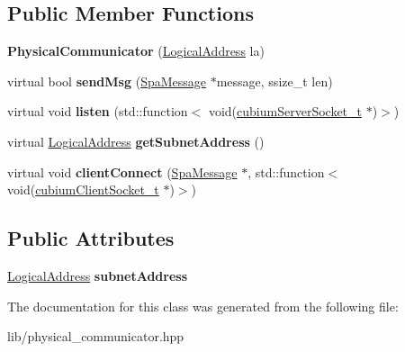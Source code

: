 \subsection*{Public Member Functions}
\begin{DoxyCompactItemize}
\item 
\mbox{\label{classPhysicalCommunicator_a6895d0ce73240eb80d0b9a060da7c728}} 
{\bfseries Physical\+Communicator} (\hyperlink{structLogicalAddress}{Logical\+Address} la)
\item 
\mbox{\label{classPhysicalCommunicator_a9fc5595b693f9908a20d0e64a6579bb5}} 
virtual bool {\bfseries send\+Msg} (\hyperlink{structSpaMessage}{Spa\+Message} $\ast$message, ssize\+\_\+t len)
\item 
\mbox{\label{classPhysicalCommunicator_a4886f4453c1f830ceaef56bc8602423f}} 
virtual void {\bfseries listen} (std\+::function$<$ void(\hyperlink{structcubiumServerSocket__t}{cubium\+Server\+Socket\+\_\+t} $\ast$)$>$)
\item 
\mbox{\label{classPhysicalCommunicator_a80f3bdf1beb61e5f6721e30fdc4d5d7f}} 
virtual \hyperlink{structLogicalAddress}{Logical\+Address} {\bfseries get\+Subnet\+Address} ()
\item 
\mbox{\label{classPhysicalCommunicator_a5984183c86e19370215736688d905fe6}} 
virtual void {\bfseries client\+Connect} (\hyperlink{structSpaMessage}{Spa\+Message} $\ast$, std\+::function$<$ void(\hyperlink{structcubiumClientSocket__t}{cubium\+Client\+Socket\+\_\+t} $\ast$)$>$)
\end{DoxyCompactItemize}
\subsection*{Public Attributes}
\begin{DoxyCompactItemize}
\item 
\mbox{\label{classPhysicalCommunicator_a2ed89508db3fe68218192a6f3bacab26}} 
\hyperlink{structLogicalAddress}{Logical\+Address} {\bfseries subnet\+Address}
\end{DoxyCompactItemize}


The documentation for this class was generated from the following file\+:\begin{DoxyCompactItemize}
\item 
lib/physical\+\_\+communicator.\+hpp\end{DoxyCompactItemize}
